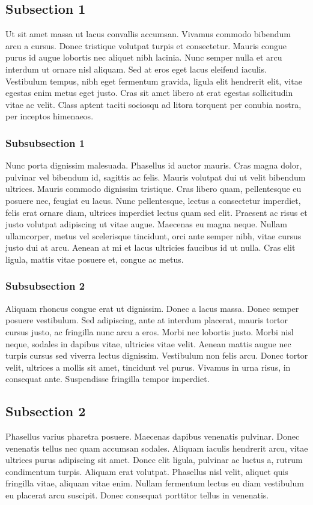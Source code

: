 \subsection{Subsection 1}
Ut sit amet massa ut lacus convallis accumsan. Vivamus commodo bibendum arcu a cursus. Donec tristique volutpat turpis
et consectetur. Mauris congue purus id augue lobortis nec aliquet nibh lacinia. Nunc semper nulla et arcu interdum ut
ornare nisl aliquam. Sed at eros eget lacus eleifend iaculis. Vestibulum tempus, nibh eget fermentum gravida, ligula
elit hendrerit elit, vitae egestas enim metus eget justo. Cras sit amet libero at erat egestas sollicitudin vitae ac
velit. Class aptent taciti sociosqu ad litora torquent per conubia nostra, per inceptos himenaeos.

\subsubsection{Subsubsection 1}
Nunc porta dignissim malesuada. Phasellus id auctor mauris. Cras magna dolor, pulvinar vel bibendum id, sagittis ac
felis. Mauris volutpat dui ut velit bibendum ultrices. Mauris commodo dignissim tristique. Cras libero quam,
pellentesque eu posuere nec, feugiat eu lacus. Nunc pellentesque, lectus a consectetur imperdiet, felis erat ornare
diam, ultrices imperdiet lectus quam sed elit. Praesent ac risus et justo volutpat adipiscing ut vitae augue. Maecenas
eu magna neque. Nullam ullamcorper, metus vel scelerisque tincidunt, orci ante semper nibh, vitae cursus justo dui at
arcu. Aenean at mi et lacus ultricies faucibus id ut nulla. Cras elit ligula, mattis vitae posuere et, congue ac metus.

\subsubsection{Subsubsection 2}
Aliquam rhoncus congue erat ut dignissim. Donec a lacus massa. Donec semper posuere vestibulum. Sed adipiscing, ante at
interdum placerat, mauris tortor cursus justo, ac fringilla nunc arcu a eros. Morbi nec lobortis justo. Morbi nisl
neque, sodales in dapibus vitae, ultricies vitae velit. Aenean mattis augue nec turpis cursus sed viverra lectus
dignissim. Vestibulum non felis arcu. Donec tortor velit, ultrices a mollis sit amet, tincidunt vel purus. Vivamus in
urna risus, in consequat ante. Suspendisse fringilla tempor imperdiet.

\subsection{Subsection 2}
Phasellus varius pharetra posuere. Maecenas dapibus venenatis pulvinar. Donec venenatis tellus nec quam accumsan
sodales. Aliquam iaculis hendrerit arcu, vitae ultrices purus adipiscing sit amet. Donec elit ligula, pulvinar ac luctus
a, rutrum condimentum turpis. Aliquam erat volutpat. Phasellus nisl velit, aliquet quis fringilla vitae, aliquam vitae
enim. Nullam fermentum lectus eu diam vestibulum eu placerat arcu suscipit. Donec consequat porttitor tellus in
venenatis.